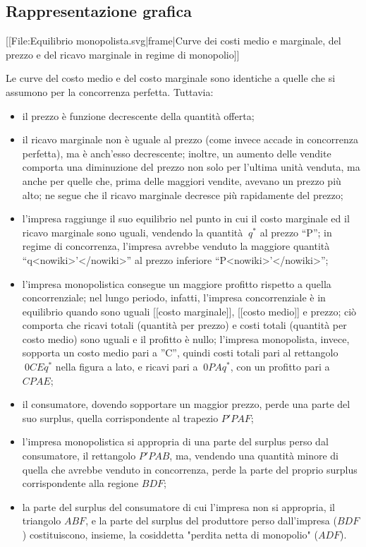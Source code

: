 \subsection{Rappresentazione grafica}

[[File:Equilibrio monopolista.svg|frame|Curve dei costi medio e marginale, del 
prezzo e del ricavo marginale in regime di monopolio]]

Le curve del costo medio e del costo marginale sono identiche a quelle 
che si assumono per la concorrenza perfetta. Tuttavia:
\begin{itemize}
 \item il prezzo è funzione decrescente della quantità offerta;
 \item il ricavo marginale non è uguale al prezzo (come invece accade in 
concorrenza perfetta), ma è anch'esso decrescente; inoltre, un aumento delle 
vendite comporta una diminuzione del prezzo non solo per l'ultima unità 
venduta, ma anche per quelle che, prima delle maggiori vendite, avevano un 
prezzo più alto; ne segue che il ricavo marginale decresce più rapidamente del 
prezzo;
 \item l'impresa raggiunge il suo equilibrio nel punto in cui il costo marginale 
ed il ricavo marginale sono uguali, vendendo la quantità \(\ q^*\) al 
prezzo ``P''; in regime di concorrenza, l'impresa avrebbe venduto la maggiore 
quantità ``q<nowiki>'</nowiki>'' al prezzo inferiore ``P<nowiki>'</nowiki>'';
 \item l'impresa monopolistica consegue un maggiore profitto rispetto a quella 
concorrenziale; nel lungo periodo, infatti, l'impresa concorrenziale è in 
equilibrio quando sono uguali [[costo marginale]], [[costo medio]] e prezzo; 
ciò comporta che ricavi totali (quantità per prezzo) e costi totali (quantità 
per costo medio) sono uguali e il profitto è nullo;
l'impresa monopolista, invece, sopporta un costo medio pari a ''C'', quindi 
costi totali pari al rettangolo \(\ 0CEq^{*}\) nella figura a lato, e 
ricavi pari a \(\ 0PAq^{*}\), con un profitto pari a \(CPAE\);
 \item il consumatore, dovendo sopportare un maggior prezzo, perde una parte del 
suo surplus, quella corrispondente al trapezio \(P'PAF\);
 \item l'impresa monopolistica si appropria di una parte del surplus perso dal 
consumatore, il rettangolo \(P' P A B\), ma, vendendo una quantità 
minore di quella che avrebbe venduto in concorrenza, perde la parte del proprio 
surplus corrispondente alla regione \(BDF\);
 \item la parte del surplus del consumatore di cui l'impresa non si appropria, 
il 
triangolo \(ABF\), e la parte del surplus del produttore perso 
dall'impresa (\(BDF\)) costituiscono, insieme, la cosiddetta "perdita 
netta di monopolio" (\(ADF\)).
\end{itemize}

